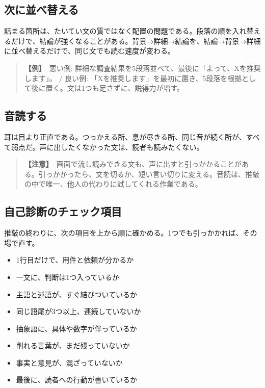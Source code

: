\documentclass{article}
\begin{document}
\subsection{次に並べ替える}

詰まる箇所は、たいてい文の質ではなく配置の問題である。段落の順を入れ替えるだけで、結論が強くなることがある。背景→詳細→結論を、結論→背景→詳細に並べ替えるだけで、同じ文でも読む速度が変わる。

\begin{quote}
\textbf{【例】}\ 悪い例: 詳細な調査結果を5段落並べて、最後に「よって、Xを推奨します」。 / 良い例: 「Xを推奨します」を最初に置き、5段落を根拠として後に置く。文は1つも足さずに、説得力が増す。
\end{quote}

\subsection{音読する}

耳は目より正直である。つっかえる所、息が尽きる所、同じ音が続く所が、すべて弱点だ。声に出したくなかった文は、読者も読みたくない。

\begin{quote}
\textbf{【注意】}\ 画面で流し読みできる文も、声に出すと引っかかることがある。引っかかったら、文を切るか、短い言い切りに変える。音読は、推敲の中で唯一、他人の代わりに試してくれる作業である。
\end{quote}

\subsection{自己診断のチェック項目}

推敲の終わりに、次の項目を上から順に確かめる。1つでも引っかかれば、その場で直す。

\begin{itemize}
\item 1行目だけで、用件と依頼が分かるか
\item 一文に、判断は1つ入っているか
\item 主語と述語が、すぐ結びついているか
\item 同じ語尾が3つ以上、連続していないか
\item 抽象語に、具体や数字が伴っているか
\item 削れる言葉が、まだ残っていないか
\item 事実と意見が、混ざっていないか
\item 最後に、読者への行動が書いているか
\end{itemize}
\end{document}
